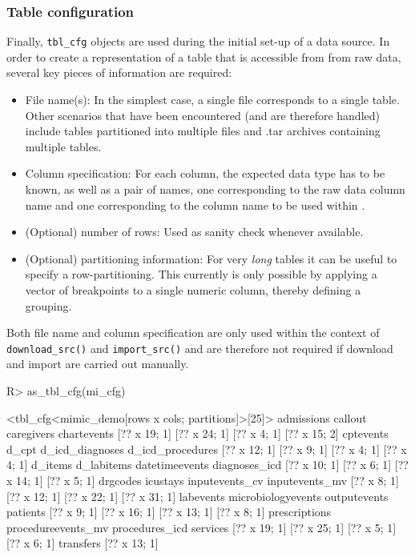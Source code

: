 \documentclass[
  notitle]{jss}
\begin{document}
\hypertarget{table-configuration}{%
\subsubsection{Table configuration}\label{table-configuration}}

Finally, \texttt{tbl\_cfg} objects are used during the initial set-up of
a data source. In order to create a representation of a table that is
accessible from  from raw data, several key pieces of
information are required:

\begin{itemize}
\item
  File name(s): In the simplest case, a single file corresponds to a
  single table. Other scenarios that have been encountered (and are
  therefore handled) include tables partitioned into multiple files and
  .tar archives containing multiple tables.
\item
  Column specification: For each column, the expected data type has to
  be known, as well as a pair of names, one corresponding to the raw
  data column name and one corresponding to the column name to be used
  within .
\item
  (Optional) number of rows: Used as sanity check whenever available.
\item
  (Optional) partitioning information: For very \emph{long} tables it
  can be useful to specify a row-partitioning. This currently is only
  possible by applying a vector of breakpoints to a single numeric
  column, thereby defining a grouping.
\end{itemize}

Both file name and column specification are only used within the context
of \texttt{download\_src()} and \texttt{import\_src()} and are therefore
not required if download and import are carried out manually.

\begin{CodeChunk}
\begin{CodeInput}
R> as_tbl_cfg(mi_cfg)
\end{CodeInput}
\begin{CodeOutput}
<tbl_cfg<mimic_demo[rows x cols; partitions]>[25]>
        admissions            callout         caregivers        chartevents 
      [?? x 19; 1]       [?? x 24; 1]        [?? x 4; 1]       [?? x 15; 2] 
         cptevents              d_cpt    d_icd_diagnoses   d_icd_procedures 
      [?? x 12; 1]        [?? x 9; 1]        [?? x 4; 1]        [?? x 4; 1] 
           d_items         d_labitems     datetimeevents      diagnoses_icd 
      [?? x 10; 1]        [?? x 6; 1]       [?? x 14; 1]        [?? x 5; 1] 
          drgcodes           icustays     inputevents_cv     inputevents_mv 
       [?? x 8; 1]       [?? x 12; 1]       [?? x 22; 1]       [?? x 31; 1] 
         labevents microbiologyevents       outputevents           patients 
       [?? x 9; 1]       [?? x 16; 1]       [?? x 13; 1]        [?? x 8; 1] 
     prescriptions procedureevents_mv     procedures_icd           services 
      [?? x 19; 1]       [?? x 25; 1]        [?? x 5; 1]        [?? x 6; 1] 
         transfers 
      [?? x 13; 1] 
\end{CodeOutput}
\end{CodeChunk}
\end{document}
